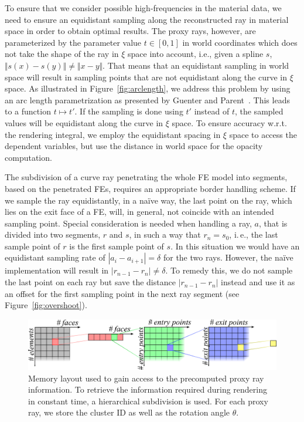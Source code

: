\documentclass[journal]{vgtc}                %
\begin{document}
To ensure that we consider possible high-frequencies in the material data, we need to ensure an equidistant sampling along the reconstructed ray in material space in order to obtain optimal results. The proxy rays, however, are parameterized by the parameter value $t \in [0,1]$ in world coordinates which does not take the shape of the ray in $\xi$ space into account, i.e., given a spline $s$, $\Vert s(x) - s(y) \Vert \neq \Vert x - y \Vert$. That means that an equidistant sampling in world space will result in sampling points that are not equidistant along the curve in $\xi$ space. As illustrated in Figure~\ref{fig:arclength}, we address this problem by using an arc length parametrization as presented by Guenter and Parent~\cite{guenter90arclength}. This leads to a function $t \mapsto t'$. If the sampling is done using $t'$ instead of $t$, the sampled values will be equidistant along the curve in $\xi$ space. To ensure accuracy w.r.t. the rendering integral, we employ the equidistant spacing in $\xi$ space to access the dependent variables, but use the distance in world space for the opacity computation.

The subdivision of a curve ray penetrating the whole FE model into segments, based on the penetrated FEs, requires an appropriate border handling scheme. If we sample the ray equidistantly, in a na\"ive way, the last point on the ray, which lies on the exit face of a FE, will, in general, not coincide with an intended sampling point. Special consideration is needed when handling a ray, $a$, that is divided into two segments, $r$ and $s$, in such a way that $r_n = s_0$, i.\,e., the last sample point of $r$ is the first sample point of $s$. In this situation we would have an equidistant sampling rate of $\left|a_i - a_{i+1}\right| = \delta$ for the two rays. However, the na\"ive implementation will result in $\left|r_{n-1} - r_{n}\right| \neq \delta$. To remedy this, we do not sample the last point on each ray but save the distance $\left|r_{n-1} - r_{n}\right|$ instead and use it as an offset for the first sampling point in the next ray segment (see Figure~\ref{fig:overshoot}).
%
%
%
\begin{figure}[t]
    \centering
    \includegraphics[width=0.76\linewidth]{figures/memory_layout.pdf}
    \caption{Memory layout used to gain access to the precomputed proxy ray information. To retrieve the information required during rendering in constant time, a hierarchical subdivision is used. For each proxy ray, we store the cluster ID as well as the rotation angle $\theta$.}
    \label{fig:memory_layout}
\end{figure}
%
%
%
\end{document}

